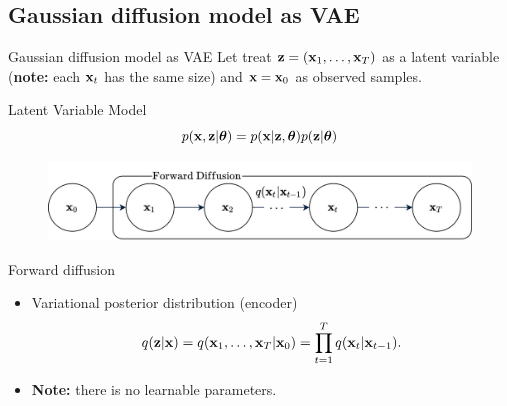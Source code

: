 \subsection{Gaussian diffusion model as VAE}
\begin{frame}{Gaussian diffusion model as VAE}
	Let treat $\mathbf{z} = (\mathbf{x}_1, \dots, \mathbf{x}_T)$ as a latent variable (\textbf{note:} each $\mathbf{x}_t$ has the same size) and $\mathbf{x} = \mathbf{x}_0$ as observed samples. 
	\begin{block}{Latent Variable Model}
		\vspace{-0.3cm}
		\[
			p(\mathbf{x}, \mathbf{z} | \boldsymbol{\theta}) = p(\mathbf{x} | \mathbf{z}, \boldsymbol{\theta}) p(\mathbf{z} | \boldsymbol{\theta})
		\]	
		\vspace{-0.7cm}
	\end{block}
	\begin{figure}
		\includegraphics[width=0.8\linewidth]{figs/diffusion_pgm_forward}
	\end{figure}
	\vspace{-0.3cm}
	\begin{block}{Forward diffusion}
		\begin{itemize}
			\item Variational posterior distribution (encoder)
			\vspace{-0.3cm}
			\[
				q(\mathbf{z} | \mathbf{x}) = q(\mathbf{x}_1, \dots, \mathbf{x}_T | \mathbf{x}_0) = \prod_{t = 1}^T q(\mathbf{x}_t | \mathbf{x}_{t - 1}).
			\]
			\item \textbf{Note:} there is no learnable parameters.
		\end{itemize}
		\vspace{-0.5cm}
	\end{block}
\end{frame}
